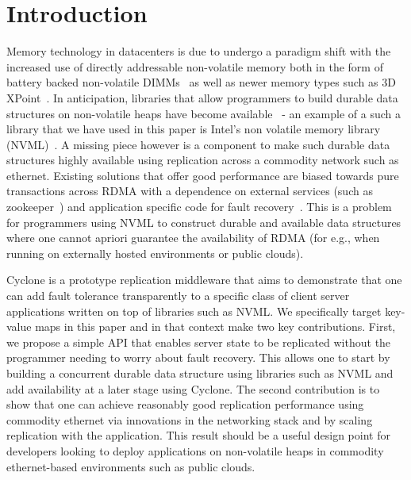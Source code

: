 \documentclass[letterpaper,twocolumn,10pt]{article}
\begin{document}
\section{Introduction}
Memory technology in datacenters is due to undergo a paradigm shift with the
increased use of directly addressable non-volatile memory both in the form of
battery backed non-volatile DIMMs~\cite{farm} as well as newer memory types
such as 3D XPoint~\cite{pmfs, bpfs}. In anticipation, libraries that allow
programmers to build durable data structures on non-volatile heaps have become
available~\cite{mnemosyne, nvheaps, cdds}  - an example of a such a
library that we have used in this paper is Intel's non volatile memory library
(NVML)~\cite{nvml}. A missing piece however is a component to make such durable 
data structures highly available using replication across a commodity network
such as ethernet. Existing solutions that offer good performance are biased
towards pure transactions across RDMA with a dependence on external services
(such as zookeeper~\cite{zookeeper}) and application specific code for
fault recovery~\cite{farm, htm}.
This is a problem for programmers using NVML to construct durable and available 
data structures where one cannot apriori guarantee the availability of
RDMA (for e.g., when running on externally hosted environments or public
clouds).

Cyclone is a prototype replication middleware that aims to demonstrate that one
can add fault tolerance transparently to a specific class of client server
applications written on top of libraries such as NVML. We specifically target
key-value maps in this paper and in that context make two key
contributions. First, we propose a simple API that enables server state to be
replicated without the programmer needing to worry about fault recovery. This
allows one to start by building a concurrent durable data structure using
libraries such as NVML and add availability at a later stage using Cyclone. The
second contribution is to show that one can achieve reasonably good replication 
performance using commodity ethernet via innovations in the networking stack and
by scaling replication with the application. This result should be a useful
design point for developers looking to deploy applications on non-volatile heaps
in commodity ethernet-based environments such as public clouds.
\end{document}
